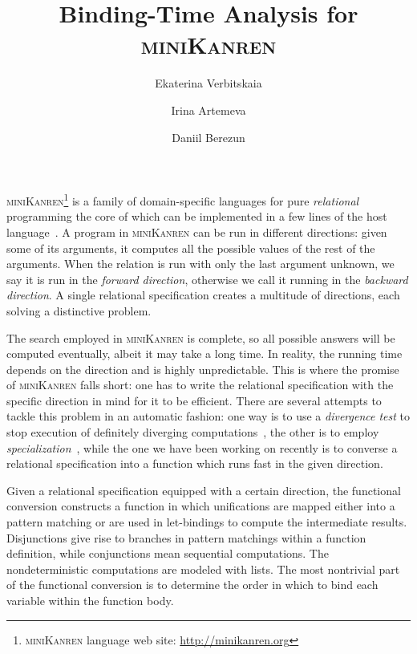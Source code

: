 \documentclass[submission,copyright,creativecommons]{eptcs}
\title{Binding-Time Analysis for \textsc{miniKanren}}
\author{Ekaterina Verbitskaia
\institute{JetBrains Research\\
Saint Petersburg, Russia}
\email{kajigor@gmail.com}
\and
Irina Artemeva
\institute{ITMO University\\
Saint Petersburg, Russia}
\email{irina-pluralia@rambler.ru}
\and
Daniil Berezun
\institute{JetBrains Research\\
Saint Petersburg, Russia}
\email{daniil.berezun@jetbrains.com }
}
\newcommand{\miniKanren}{\textsc{miniKanren}}
\begin{document}
\maketitle


\miniKanren{}\footnote{\miniKanren{} language web site: \url{http://minikanren.org}} is a family of domain-specific languages for pure \emph{relational} programming the core of which can be implemented in a few lines of the host language~\cite{hemann2013ukanren}.
A program in \miniKanren{} can be run in different directions: given some of its arguments, it computes all the possible values of the rest of the arguments.
When the relation is run with only the last argument unknown, we say it is run in the \emph{forward direction}, otherwise we call it running in the \emph{backward direction}.
A single relational specification creates a multitude of directions, each solving a distinctive problem.

The search employed in \miniKanren{} is complete, so all possible answers will be computed eventually, albeit it may take a long time.
In reality, the running time depends on the direction and is highly unpredictable.
This is where the promise of \miniKanren{} falls short: one has to write the relational specification with the specific direction in mind for it to be efficient.
There are several attempts to tackle this problem in an automatic fashion: one way is to use a \emph{divergence test} to stop execution of definitely diverging computations~\cite{rozplokhas2018improving}, the other is to employ \emph{specialization}~\cite{lozov2019relational}, while the one we have been working on recently is to converse a relational specification into a function which runs fast in the given direction.

Given a relational specification equipped with a certain direction, the functional conversion constructs a function in which unifications are mapped either into a pattern matching or are used in let-bindings to compute the intermediate results.
Disjunctions give rise to branches in pattern matchings within a function definition, while conjunctions mean sequential computations.
The nondeterministic computations are modeled with lists.
The most nontrivial part of the functional conversion is to determine the order in which to bind each variable within the function body.
\end{document}
